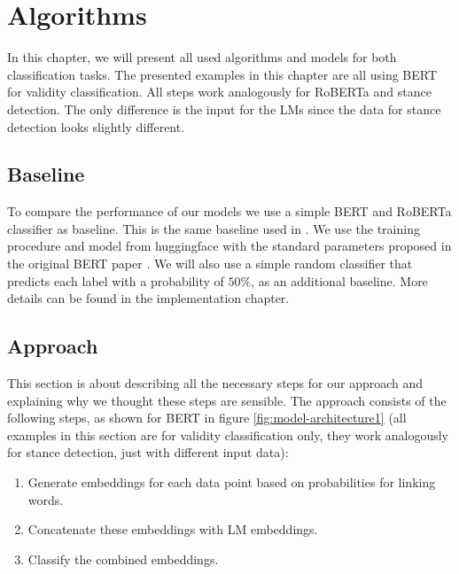 \section{Algorithms}
In this chapter, we will present all used algorithms and models for both classification tasks. The presented examples in this chapter are all using BERT for validity classification. All steps work analogously for RoBERTa and stance detection. The only difference is the input for the LMs since the data for stance detection looks slightly different.

\subsection{Baseline}
To compare the performance of our models we use a simple BERT and RoBERTa classifier \cite{bert, roberta} as baseline. This is the same baseline used in \cite{argsvalidnovel2022}. We use the training procedure and model from huggingface \cite{berttraining} with the standard parameters proposed in the original BERT paper \cite{bert}. We will also use a simple random classifier that predicts each label with a probability of $50\%$, as an additional baseline. More details can be found in the implementation chapter.

\subsection{Approach}

This section is about describing all the necessary steps for our approach and explaining why we thought these steps are sensible. The approach consists of the following steps, as shown for BERT in figure \ref{fig:model-architecture1} (all examples in this section are for validity classification only, they work analogously for stance detection, just with different input data):

\begin{enumerate}
	\item Generate embeddings for each data point based on probabilities for linking words.
	\item Concatenate these embeddings with LM embeddings.
	\item Classify the combined embeddings.
\end{enumerate}

